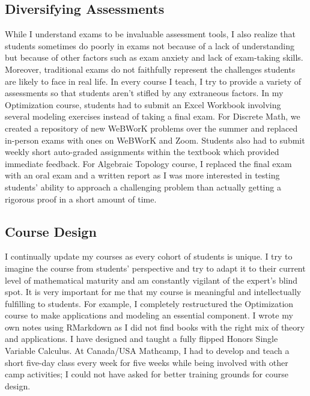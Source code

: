 \documentclass[10pt]{amsbook}
\begin{document}
  \subsection*{Diversifying Assessments}
  While I understand exams to be invaluable assessment tools, I also realize that students sometimes do poorly in exams not because of a lack of understanding but because of other factors such as exam anxiety and lack of exam-taking skills. 
  Moreover, traditional exams do not faithfully represent the challenges students are likely to face in real life.
  In every course I teach, I try to provide a variety of assessments so that students aren't stifled by any extraneous factors. In my Optimization course, students had to submit an Excel Workbook involving several modeling exercises instead of taking a final exam. For Discrete Math, we created a repository of new WeBWorK problems over the summer and replaced in-person exams with ones on WeBWorK and Zoom. Students also had to submit weekly short auto-graded assignments within the textbook which provided immediate feedback. For Algebraic Topology course, I replaced the final exam with an oral exam and a written report as I was more interested in testing students' ability to approach a challenging problem than actually getting a rigorous proof in a short amount of time.
  
  \subsection*{Course Design}
  I continually update my courses as every cohort of students is unique. 
  I try to imagine the course from students' perspective and try to adapt it to their current level of mathematical maturity and am constantly vigilant of the expert's blind spot.
  It is very important for me that my course is meaningful and intellectually fulfilling to students.
  For example, I completely restructured the Optimization course to make applications and modeling an essential component. 
  I wrote my own notes using RMarkdown as I did not find books with the right mix of theory and applications. 
  I have designed and taught a fully flipped Honors Single Variable Calculus. 
  At Canada/USA Mathcamp, I had to develop and teach a short five-day class every week for five weeks while being involved with other camp activities;
  I could not have asked for better training grounds for course design.  
\end{document}
